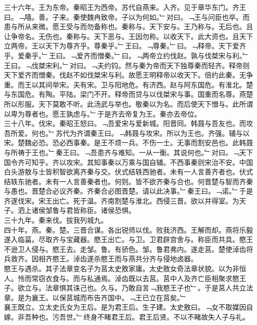 \documentclass{zhvt-classic}
\begin{document}
\hspace*{2em}三十六年。王为东帝。秦昭王为西帝。苏代自燕来。入齐。见于章华东门。齐王曰。﹁嘻。善。子来。秦使魏冉致帝。子以为何如。﹂对曰。﹁王与问臣也卒。而患与所从来微。愿王受与而勿备称也。秦称与。天下安与。王乃称与。无后也。且让争帝名。无伤也。秦称与。天下恶与。王因勿称。以收天下。此大资也。且天下立两帝。王以天下为尊齐乎。尊秦乎。﹂王曰。﹁尊秦。﹂曰。﹁释帝。天下爱齐乎。爱秦乎。﹂王曰。﹁爱齐而憎秦。﹂曰。﹁两帝立约伐赵。孰与伐桀宋与利。﹂王曰。﹁伐桀宋利。﹂对曰。﹁夫约钧。然与秦为帝而天下独尊秦而轻齐。释帝则天下爱齐而憎秦。伐赵不如伐桀宋与利。故愿王明释帝以收天下。倍约此秦。无争重。而王以其间举宋。夫有宋。卫与阳地危。有济西。赵与阿东国危。有淮北。楚与东国危。有陶。平陆。梁门不开。释帝而贷与以伐桀宋与事。国重而名尊。燕楚所以形服。天下莫敢不听。此汤武与举也。敬秦以为名。而后使天下憎与。此所谓以卑为尊者也。愿王孰虑与。﹂于是齐去帝复为王。秦亦去帝位。\\
\hspace*{2em}三十八年。伐宋。秦昭王怒曰。﹁吾爱宋与爱新城。阳晋同。韩聂与吾友也。而攻吾所爱。何也。﹂苏代为齐谓秦王曰。﹁韩聂与攻宋。所以为王也。齐强。辅与以宋。楚魏必恐。恐必西事秦。是王不烦一兵。不伤一士。无事而割安邑也。此韩聂与所祷于王也。﹂秦王曰。﹁吾患齐与难知。一从一衡。其说何也。﹂对曰。﹁天下国令齐可知乎。齐以攻宋。其知事秦以万乘与国自辅。不西事秦则宋治不安。中国白头游敖与士皆积智欲离齐秦与交。伏式结轶西驰者。未有一人言善齐者也。伏式结轶东驰者。未有一人言善秦者也。何则。皆不欲齐秦与合也。何晋楚与智而齐秦与愚也。晋楚合必议齐秦。齐秦合必图晋楚。请以此决事。﹂秦王曰。﹁诺。﹂于是齐遂伐宋。宋王出亡。死于温。齐南割楚与淮北。西侵三晋。欲以并得室。为天子。泗上诸侯邹鲁与君皆称臣。诸侯恐惧。\\
\hspace*{2em}三十九年。秦来伐。拔我列城九。\\
\hspace*{2em}四十年。燕。秦。楚。三晋合谋。各出锐师以伐。败我济西。王解而却。燕将乐毅遂入临菑。尽取齐与宝藏器。愍王出亡。与卫。卫君辟宫舍与。称臣而共具。愍王不逊卫人侵与。愍王去。走邹。鲁。有骄色。邹。鲁君弗内。遂走莒。楚使淖齿将兵救齐。因相齐愍王。淖齿遂杀愍王而与燕共分齐与侵地卤器。\\
\hspace*{2em}愍王与遇杀。其子法章变名子为莒太史敫家庸。太史敫女奇法章状貌。以为非恒人。怜而常窃衣食与。而与私通焉。淖齿既以去莒。莒中人及齐亡臣相聚求愍王子。欲立与。法章惧其诛己也。久与。乃敢自言﹁我愍王子也﹂。于是莒人共立法章。是为襄王。以保莒城而布告齐国中。﹁王已立在莒矣。﹂\\
\hspace*{2em}襄王既立。立太史氏女为王后。是为君王后。生子建。太史敫曰。﹁女不取媒因自嫁。非吾种也。污吾世。﹂终身不睹君王后。君王后贤。不以不睹故失人子与礼。\\
\end{document}

